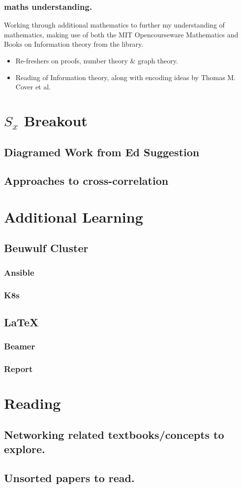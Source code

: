 \documentclass[]{scrreprt}
\begin{document}
\subsection{maths understanding.}
Working through additional mathematics to further my understanding of mathematics, making use of both the MIT Opencourseware Mathematics and Books on Information theory from the library.
\begin{itemize}
  \item Re-freshers on proofs, number theory \& graph theory.
  \item Reading of Information theory, along with encoding ideas by Thomas M. Cover et al.
\end{itemize}


\chapter{$S_{x}$ Breakout }
\section{Diagramed Work from Ed Suggestion}
\section{Approaches  to cross-correlation}

\chapter{Additional Learning}
\section{Beuwulf Cluster}
\subsection{Ansible}
\subsection{K8s}
\section{\LaTeX}
\subsection{Beamer}
\subsection{Report}

\chapter{Reading}
\section{Networking related textbooks/concepts to explore.}
\section{Unsorted papers to read.}
\end{document}
